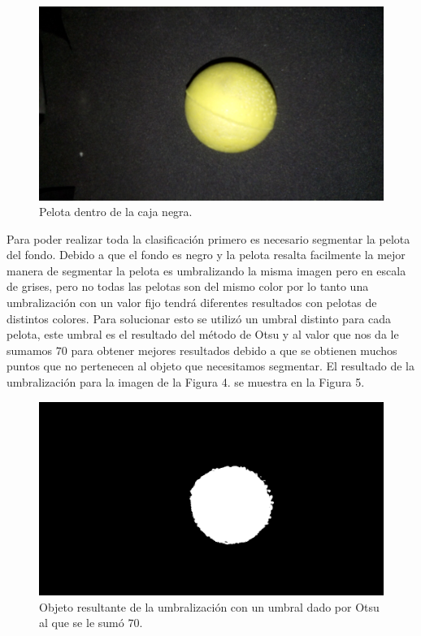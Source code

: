 \documentclass[conference]{IEEEtran}
\begin{document}
\begin{figure}[h]
	\setlength{\unitlength}{0.0105in}
	\centering
	\includegraphics[scale=0.20]{./images/ball_inside.jpg}
	\caption{ Pelota dentro de la caja negra.}	
\end{figure}

Para poder realizar toda la clasificaci\'on primero es necesario segmentar la pelota del fondo. Debido a que el fondo es negro y la pelota resalta facilmente la mejor manera de segmentar la pelota es umbralizando la misma imagen pero en escala de grises, pero no todas las pelotas son del mismo color por lo tanto una umbralizaci\'on con un valor fijo tendr\'a diferentes resultados con pelotas de distintos colores. Para solucionar esto se utiliz\'o un umbral distinto para cada pelota, este umbral es el resultado del m\'etodo de Otsu y al valor que nos da le sumamos $70$ para obtener mejores resultados debido a que se obtienen muchos puntos que no pertenecen al objeto que necesitamos segmentar. El resultado de la umbralizaci\'on para la imagen de la Figura 4. se muestra en la Figura 5. \\

\begin{figure}[h]
	\setlength{\unitlength}{0.0105in}
	\centering
	\includegraphics[scale=0.20]{./images/2umbralizacion.png}
	\caption{ Objeto resultante de la umbralizaci\'on con un umbral dado por Otsu al que se le sum\'o $70$.}
\end{figure}
\end{document}
